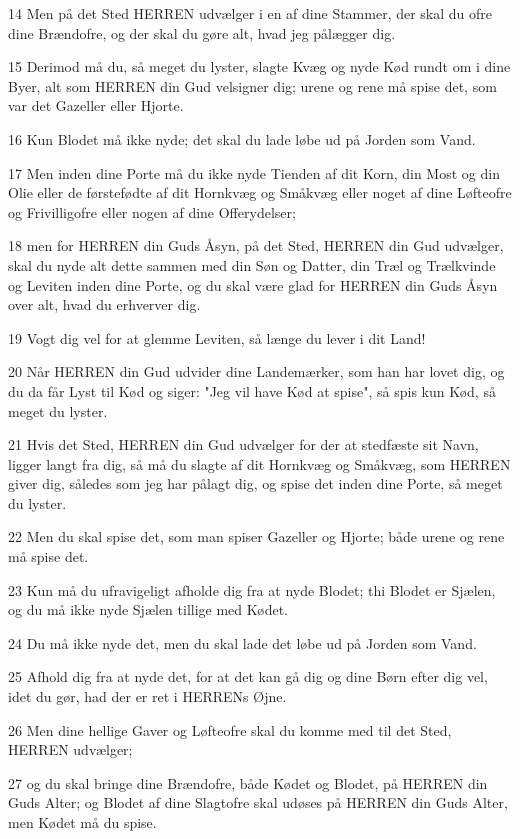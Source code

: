 \par 14 Men på det Sted HERREN udvælger i en af dine Stammer, der skal du ofre dine Brændofre, og der skal du gøre alt, hvad jeg pålægger dig.
\par 15 Derimod må du, så meget du lyster, slagte Kvæg og nyde Kød rundt om i dine Byer, alt som HERREN din Gud velsigner dig; urene og rene må spise det, som var det Gazeller eller Hjorte.
\par 16 Kun Blodet må ikke nyde; det skal du lade løbe ud på Jorden som Vand.
\par 17 Men inden dine Porte må du ikke nyde Tienden af dit Korn, din Most og din Olie eller de førstefødte af dit Hornkvæg og Småkvæg eller noget af dine Løfteofre og Frivilligofre eller nogen af dine Offerydelser;
\par 18 men for HERREN din Guds Åsyn, på det Sted, HERREN din Gud udvælger, skal du nyde alt dette sammen med din Søn og Datter, din Træl og Trælkvinde og Leviten inden dine Porte, og du skal være glad for HERREN din Guds Åsyn over alt, hvad du erhverver dig.
\par 19 Vogt dig vel for at glemme Leviten, så længe du lever i dit Land!
\par 20 Når HERREN din Gud udvider dine Landemærker, som han har lovet dig, og du da får Lyst til Kød og siger: "Jeg vil have Kød at spise", så spis kun Kød, så meget du lyster.
\par 21 Hvis det Sted, HERREN din Gud udvælger for der at stedfæste sit Navn, ligger langt fra dig, så må du slagte af dit Hornkvæg og Småkvæg, som HERREN giver dig, således som jeg har pålagt dig, og spise det inden dine Porte, så meget du lyster.
\par 22 Men du skal spise det, som man spiser Gazeller og Hjorte; både urene og rene må spise det.
\par 23 Kun må du ufravigeligt afholde dig fra at nyde Blodet; thi Blodet er Sjælen, og du må ikke nyde Sjælen tillige med Kødet.
\par 24 Du må ikke nyde det, men du skal lade det løbe ud på Jorden som Vand.
\par 25 Afhold dig fra at nyde det, for at det kan gå dig og dine Børn efter dig vel, idet du gør, had der er ret i HERRENs Øjne.
\par 26 Men dine hellige Gaver og Løfteofre skal du komme med til det Sted, HERREN udvælger;
\par 27 og du skal bringe dine Brændofre, både Kødet og Blodet, på HERREN din Guds Alter; og Blodet af dine Slagtofre skal udøses på HERREN din Guds Alter, men Kødet må du spise.

